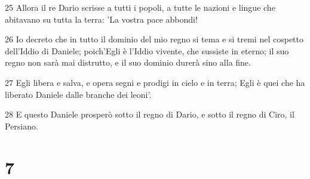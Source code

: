 \par 25 Allora il re Dario scrisse a tutti i popoli, a tutte le nazioni e lingue che abitavano su tutta la terra: 'La vostra pace abbondi!
\par 26 Io decreto che in tutto il dominio del mio regno si tema e si tremi nel cospetto dell'Iddio di Daniele; poich'Egli è l'Iddio vivente, che sussiste in eterno; il suo regno non sarà mai distrutto, e il suo dominio durerà sino alla fine.
\par 27 Egli libera e salva, e opera segni e prodigi in cielo e in terra; Egli è quei che ha liberato Daniele dalle branche dei leoni'.
\par 28 E questo Daniele prosperò sotto il regno di Dario, e sotto il regno di Ciro, il Persiano.

\chapter{7}

